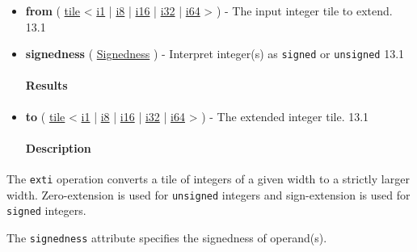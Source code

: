 \documentclass{article}
\begin{document}
\begin{itemize}
\item \textbf{from} ( \href{https://docs.nvidia.com/cuda/tile-ir/latest/sections/types.html#type-tile}{tile} < \href{https://docs.nvidia.com/cuda/tile-ir/latest/sections/types.html#subsection-element-types}{i1} | \href{https://docs.nvidia.com/cuda/tile-ir/latest/sections/types.html#subsection-element-types}{i8} | \href{https://docs.nvidia.com/cuda/tile-ir/latest/sections/types.html#subsection-element-types}{i16} | \href{https://docs.nvidia.com/cuda/tile-ir/latest/sections/types.html#subsection-element-types}{i32} | \href{https://docs.nvidia.com/cuda/tile-ir/latest/sections/types.html#subsection-element-types}{i64} > ) - The input integer tile to extend. 13.1
\item \textbf{signedness} ( \href{https://docs.nvidia.com/cuda/tile-ir/latest/sections/operations.html#op-attribute-cuda-tile-exti-signedness-attr}{Signedness} ) - Interpret integer(s) as \texttt{signed} or \texttt{unsigned} 13.1


\paragraph{Results}

\item \textbf{to} ( \href{https://docs.nvidia.com/cuda/tile-ir/latest/sections/types.html#type-tile}{tile} < \href{https://docs.nvidia.com/cuda/tile-ir/latest/sections/types.html#subsection-element-types}{i1} | \href{https://docs.nvidia.com/cuda/tile-ir/latest/sections/types.html#subsection-element-types}{i8} | \href{https://docs.nvidia.com/cuda/tile-ir/latest/sections/types.html#subsection-element-types}{i16} | \href{https://docs.nvidia.com/cuda/tile-ir/latest/sections/types.html#subsection-element-types}{i32} | \href{https://docs.nvidia.com/cuda/tile-ir/latest/sections/types.html#subsection-element-types}{i64} > ) - The extended integer tile. 13.1


\paragraph{Description}

\end{itemize}
The \texttt{exti} operation converts a tile of integers of a given width to a strictly larger width. Zero-extension is used for \texttt{unsigned} integers and sign-extension is used for \texttt{signed} integers.


The \texttt{signedness} attribute specifies the signedness of operand(s).
\end{document}
